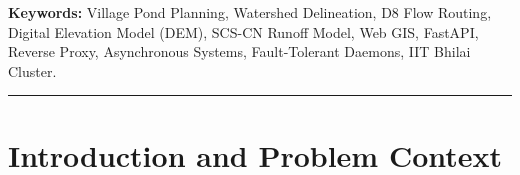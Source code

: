 \documentclass[11pt,a4paper]{article}
\begin{document}
\begin{abstract}
The system is architected around a strict separation of concerns, featuring a 100\% vanilla HTML5/CSS3/JavaScript single-page frontend (with zero React and zero WebSockets) connected to an asynchronous Python 3.12 FastAPI backend through an embedded multi-threaded reverse proxy. Deployed permanently on allocated cluster system \texttt{stu29\_sys2} (\texttt{10.1.75.51:2314}), the platform achieves sub-220\,ms end-to-end analysis latency, 24/7 autonomous watchdog self-healing, and complete immunity to campus router packet dropping. Comprehensive experimental evaluations across Chhattisgarh agrarian watersheds demonstrate that JalDrishti can accurately identify natural hydrological convergence zones and calculate harvestable runoff yields exceeding 64\,million liters per square kilometer, thereby providing a robust, democratized platform for rural climate resilience.
\end{abstract}

\textbf{Keywords:} Village Pond Planning, Watershed Delineation, D8 Flow Routing, Digital Elevation Model (DEM), SCS-CN Runoff Model, Web GIS, FastAPI, Reverse Proxy, Asynchronous Systems, Fault-Tolerant Daemons, IIT Bhilai Cluster.

\vspace{0.2cm}
\hrule
\vspace{0.2cm}

\section{Introduction and Problem Context}
\label{sec:intro}
\end{document}
